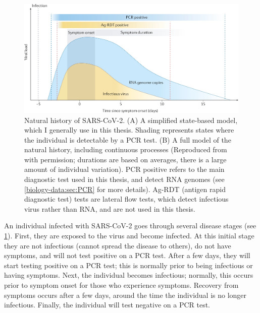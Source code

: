 \documentclass[thesis.tex]{subfiles}
\begin{document}
\begin{figure}
{
  }
  \centering\includegraphics[width=\textwidth]{biology-data/natural-history}
  \caption[Natural history of SARS-CoV-2.]{%
    Natural history of SARS-CoV-2.
    (A) A simplified state-based model, which I generally use in this thesis.
    Shading represents states where the individual is detectable by a PCR test.
    (B) A full model of the natural history, including continuous processes (Reproduced from \textcite{puhachSARSCoV2} with permission; durations are based on averages, there is a large amount of individual variation).
    PCR positive refers to the main diagnostic test used in this thesis, and detect RNA genomes (see \cref{biology-data:sec:PCR} for more details).
    Ag-RDT (antigen rapid diagnostic test) tests are lateral flow tests, which detect infectious virus rather than RNA, and are not used in this thesis.
  }
  \label{biology-data:fig:natural-history}
\end{figure}

An individual infected with SARS-CoV-2 goes through several disease stages (see \cref{biology-data:fig:natural-history}).
First, they are exposed to the virus and become infected.
At this initial stage they are not infectious (cannot spread the disease to others), do not have symptoms, and will not test positive on a PCR test.
After a few days, they will start testing positive on a PCR test; this is normally prior to being infectious or having symptoms.
Next, the individual becomes infectious; normally, this occurs prior to symptom onset for those who experience symptoms.
Recovery from symptoms occurs after a few days, around the time the individual is no longer infectious.
Finally, the individual will test negative on a PCR test.
\end{document}
